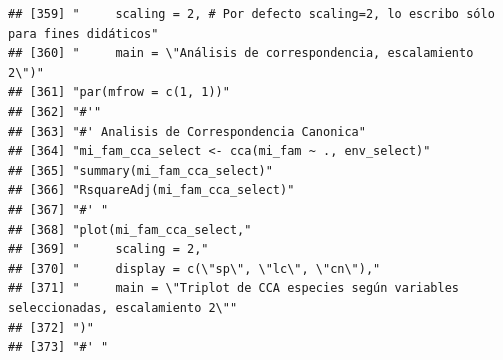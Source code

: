\documentclass[11pt,]{article}
\begin{document}
\begin{verbatim}
## [359] "     scaling = 2, # Por defecto scaling=2, lo escribo sólo para fines didáticos"                                                                                       
## [360] "     main = \"Análisis de correspondencia, escalamiento 2\")"                                                                                                          
## [361] "par(mfrow = c(1, 1))"                                                                                                                                                  
## [362] "#'"                                                                                                                                                                    
## [363] "#' Analisis de Correspondencia Canonica"                                                                                                                               
## [364] "mi_fam_cca_select <- cca(mi_fam ~ ., env_select)"                                                                                                                      
## [365] "summary(mi_fam_cca_select)"                                                                                                                                            
## [366] "RsquareAdj(mi_fam_cca_select)"                                                                                                                                         
## [367] "#' "                                                                                                                                                                   
## [368] "plot(mi_fam_cca_select,"                                                                                                                                               
## [369] "     scaling = 2,"                                                                                                                                                     
## [370] "     display = c(\"sp\", \"lc\", \"cn\"),"                                                                                                                             
## [371] "     main = \"Triplot de CCA especies según variables seleccionadas, escalamiento 2\""                                                                                 
## [372] ")"                                                                                                                                                                     
## [373] "#' "                                                                                                                                                                   

\end{verbatim}
\end{document}
